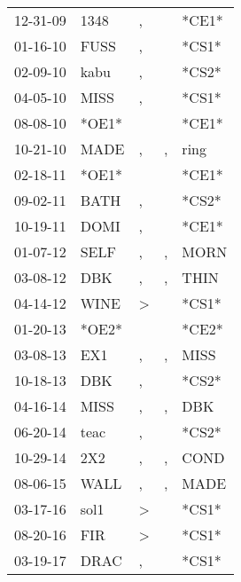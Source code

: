 \begin{supertabular}{lllll}
 12-31-09 &   1348 &             , &    &  *CE1* \\
 01-16-10 &   FUSS &             , &    &  *CS1* \\
 02-09-10 &   kabu &             , &    &  *CS2* \\
 04-05-10 &   MISS &             , &    &  *CS1* \\
 08-08-10 &  *OE1* &               &    &  *CE1* \\
 10-21-10 &   MADE &             , &  , &   ring \\
 02-18-11 &  *OE1* &               &    &  *CE1* \\
 09-02-11 &   BATH &             , &    &  *CS2* \\
 10-19-11 &   DOMI &             , &    &  *CE1* \\
 01-07-12 &   SELF &             , &  , &   MORN \\
 03-08-12 &    DBK &             , &  , &   THIN \\
 04-14-12 &   WINE &  \textgreater &    &  *CS1* \\
 01-20-13 &  *OE2* &               &    &  *CE2* \\
 03-08-13 &    EX1 &             , &  , &   MISS \\
 10-18-13 &    DBK &             , &    &  *CS2* \\
 04-16-14 &   MISS &             , &  , &    DBK \\
 06-20-14 &   teac &             , &    &  *CS2* \\
 10-29-14 &    2X2 &             , &  , &   COND \\
 08-06-15 &   WALL &             , &  , &   MADE \\
 03-17-16 &   sol1 &  \textgreater &    &  *CS1* \\
 08-20-16 &    FIR &  \textgreater &    &  *CS1* \\
 03-19-17 &   DRAC &             , &    &  *CS1* \\
\end{supertabular}
